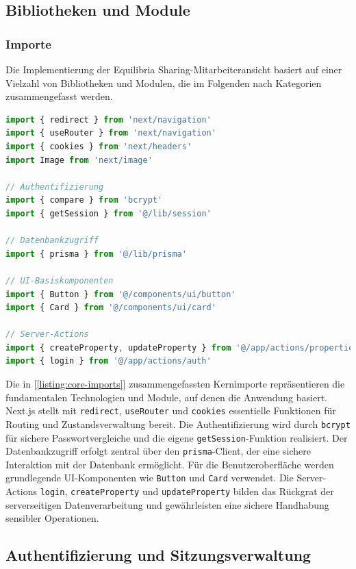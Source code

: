\subsection{Bibliotheken und Module}

\subsubsection{Importe}

Die Implementierung der Equilibria Sharing-Mitarbeiteransicht basiert auf einer Vielzahl von Bibliotheken und Modulen, die im Folgenden nach Kategorien zusammengefasst werden.
\begin{lstlisting}[language=JavaScript, caption={Kernimporte der Anwendung.}, label={listing:core-imports}]
import { redirect } from 'next/navigation'
import { useRouter } from 'next/navigation'
import { cookies } from 'next/headers'
import Image from 'next/image'
		
// Authentifizierung
import { compare } from 'bcrypt'
import { getSession } from '@/lib/session'
		
// Datenbankzugriff
import { prisma } from '@/lib/prisma'
		
// UI-Basiskomponenten
import { Button } from '@/components/ui/button'
import { Card } from '@/components/ui/card'
		
// Server-Actions
import { createProperty, updateProperty } from '@/app/actions/properties'
import { login } from '@/app/actions/auth'
\end{lstlisting}

Die in [\ref{listing:core-imports}] zusammengefassten Kernimporte repräsentieren die fundamentalen Technologien und Module, auf denen die Anwendung basiert. Next.js stellt mit \texttt{redirect}, \texttt{useRouter} und \texttt{cookies} essentielle Funktionen für Routing und Zustandsverwaltung bereit. Die Authentifizierung wird durch \texttt{bcrypt} für sichere Passwortvergleiche und die eigene \texttt{getSession}-Funktion realisiert. Der Datenbankzugriff erfolgt zentral über den \texttt{prisma}-Client, der eine sichere Interaktion mit der Datenbank ermöglicht. Für die Benutzeroberfläche werden grundlegende UI-Komponenten wie \texttt{Button} und \texttt{Card} verwendet. Die Server-Actions \texttt{login}, \texttt{createProperty} und \texttt{updateProperty} bilden das Rückgrat der serverseitigen Datenverarbeitung und gewährleisten eine sichere Handhabung sensibler Operationen.



\subsection{Authentifizierung und Sitzungsverwaltung}

